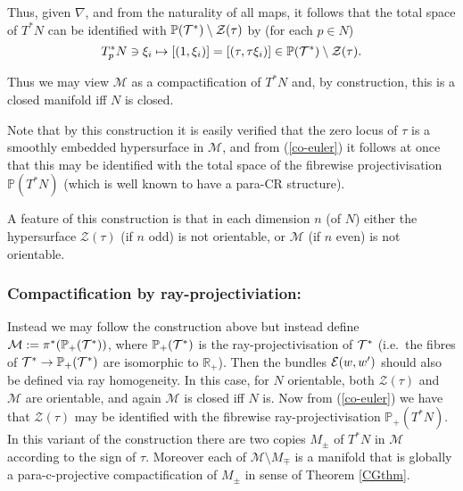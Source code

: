   Thus, given $\nabla$, and  from the naturality of all maps, it
  follows that the total space of $T^*N$ can be identified with $\mathbb{P}(\mathcal{T}^*)\setminus \mathcal{Z}(\tau)$
  by (for each $p\in N$)
\begin{equation}
T_p^*N\ni \xi_i  \mapsto [(1,\xi_i)]=[(\tau,\tau \xi_i)]\in
\mathbb{P}(\mathcal{T}^*)\setminus \mathcal{Z}(\tau) .
\end{equation}

Thus we may view $\mathcal{M}$ as a
compactification of $T^*N$  and, by construction,
this is a closed manifold iff $N$ is closed.


Note that by this construction it is easily verified that the zero
locus of $\tau$ is a smoothly
embedded hypersurface in $\mathcal{M}$,  and from (\ref{co-euler}) it follows
at once that this may be identified with the total space of the
fibrewise projectivisation $\mathbb{P}(T^*N)$ (which is well known to
have a para-CR structure). 

A feature of this construction is that in each dimension $n$ (of $N$)
either the hypersurface $\mathcal{Z}(\tau)$ (if $n$ odd) is not
orientable, or $\mathcal{M}$ (if $n$ even) is not orientable.  


\subsubsection{Compactification by ray-projectiviation:}
\label{ray_sub}
Instead we may follow the construction above but instead define
$\mathcal{M}:= \pi^*(\mathbb{P}_+(\mathcal{T}^*))$, where $\mathbb{P}_+(\mathcal{T}^*)$ is
the ray-projectivisation of $\mathcal{T}^*$ (i.e.\ the fibres of $\mathcal{T}^*\to
\mathbb{P}_+(\mathcal{T}^*)$ are isomorphic to $\mathbb{R}_+$). Then the bundles $\mathcal{E}(w,w')$
should also be defined via ray homogeneity.
In this case, for $N$ orientable,
both $\mathcal{Z}(\tau)$ and $\mathcal{M}$ are orientable, and again
$\mathcal{M}$ is closed iff $N$ is. Now from (\ref{co-euler}) we have that
$\mathcal{Z}(\tau)$ may be identified with the
fibrewise ray-projectivisation $\mathbb{P}_+(T^*N)$.
In this variant of the
construction there are two copies $M_{\pm}$ of $T^*N$ in $\mathcal{M}$
according to the sign of $\tau$. Moreover each of $\mathcal{M}\setminus
M_{\mp}$ is a manifold that is globally a para-c-projective
compactification of $M_{\pm}$ in sense of Theorem \ref{CGthm}.

